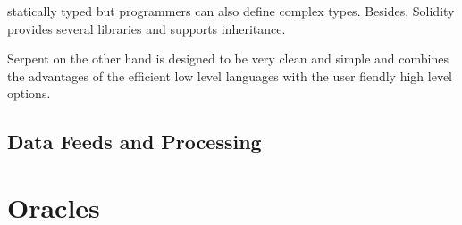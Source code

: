 \documentclass[conference]{IEEEtran}
\begin{document}
statically typed but programmers can also define complex types. Besides, Solidity provides several libraries and supports inheritance. \cite{McAdams2017} \par 
Serpent on the other hand is designed to be very clean and simple and combines the advantages of the efficient low level languages with the user fiendly high level options. \cite{McAdams2017} \par 

\subsection{Data Feeds and Processing}

\section{Oracles}
%
%

\end{document}
